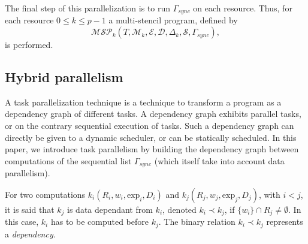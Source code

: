 

 The final step of this parallelization is to run $\Gamma_{sync}$ on each resource. Thus, for each resource $0 \leq k \leq p-1$ a multi-stencil program, defined by
\begin{equation}
\mathcal{MSP}_k(T,\mathcal{M}_k,\mathcal{E},\mathcal{D},\Delta_k,\mathcal{S},\Gamma_{sync}),
\end{equation}
is performed.


\subsection{Hybrid parallelism}
A task parallelization technique is a technique to transform a program as a dependency graph of different tasks. A dependency graph exhibits parallel tasks, or on the contrary sequential execution of tasks. Such a dependency graph can directly be given to a dynamic scheduler, or can be statically scheduled. In this paper, we introduce task parallelism by building the dependency graph between computations of the sequential list $\Gamma_{sync}$ (which itself take into account data parallelism).

\begin{mydef}
For two computations $k_i(R_i,w_i,\text{exp}_i,D_i)$ and $k_j(R_j,w_j,\text{exp}_j,D_j)$, with $i < j$, it is said that $k_j$ is data dependant from $k_i$, denoted $k_i\prec k_j$, if $\{w_i\} \cap R_j \neq \emptyset$. In this case, $k_i$ has to be computed before $k_j$. The binary relation $k_i\prec k_j$ represents a \textit{dependency}.
\end{mydef}


